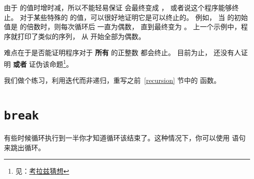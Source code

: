 
由于  的值时增时减，所以不能轻易保证  会最终变成 ， 或者说这个程序能够终止。 对于某些特殊的  的值，可以很好地证明它是可以终止的。 例如， 当  的初始值是  的倍数时，则每次循环后  一直为偶数， 直到最终变为 。 上一个示例中，程序就打印了类似的序列， 从  开始全部为偶数。


难点在于是否能证明程序对于 {\bf 所有} 的正整数  都会终止。 目前为止，
还没有人证明 {\bf 或者} 证伪该命题\footnote{见：\href{http://en.wikipedia.org/wiki/Collatz_conjecture}{考拉兹猜想}}。
  


我们做个练习，利用迭代而非递归，重写之前~\ref{recursion} 节中的  函数。

\section{{\tt break} }
  


有些时候循环执行到一半你才知道循环该结束了。这种情况下，你可以使用  语句来跳出循环。


